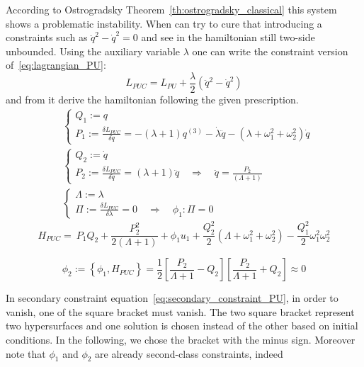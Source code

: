 According to Ostrogradsky Theorem~\ref{th:ostrogradsky_classical} this system
shows a problematic instability. When can try to cure that introducing a
constraints such as $\ddot{q}^2 - \dot{q}^2 = 0$ and see in the hamiltonian
still two-side unbounded. Using the auxiliary variable $\lambda$ one can write
the constraint version of~\eqref{eq:lagrangian_PU}:
\begin{equation} \label{eq:lagrangian_PUC}
  L_{PUC} = L_{PU} + \frac{\lambda}{2} \left(\ddot{q}^2 - \dot{q}^2\right)
\end{equation}
and from it derive the hamiltonian following the given prescription.
\begin{align*}
  & \begin{cases}
    Q_1 := q \\
    P_1 := \frac{\delta L_{PUC}}{\delta \dot{q}} =
        - (\lambda + 1) q^{(3)} - \dot{\lambda}\ddot{q}
        - (\lambda + \omega_1^2 + \omega_2^2)\dot{q}
  \end{cases} \\
  & \begin{cases}
    Q_2 := \dot{q} \\
    P_2 := \frac{\delta L_{PUC}}{\delta \ddot{q}} =
        (\lambda + 1) \ddot{q}
        \quad  \Rightarrow \quad \ddot{q} = \frac{P_2}{(\Lambda + 1)}
  \end{cases} \\
  & \begin{cases}
    \Lambda := \lambda \\
    \Pi := \frac{\delta L_{PUC}}{\delta \lambda} = 0
        \quad  \Rightarrow \quad \phi_1: \Pi = 0
  \end{cases}
\end{align*}
\begin{equation} \label{eq:ham_PUC_with_aux_vars}
   H_{PUC} =\ P_1 Q_2 + \frac{P_2^2}{2(\Lambda + 1)} + \phi_1 u_1
  + \frac{Q_2^2}{2} \left(\Lambda + \omega_1^2 + \omega_2^2 \right)
  - \frac{Q_1^2}{2} \omega_1^2 \omega_2^2
\end{equation}

\begin{equation} \label{eq:secondary_constraint_PU}
  \phi_2 :=
  \left\{ \phi_1, H_{PUC} \right\} =
  \frac{1}{2} \left[ \frac{P_2}{\Lambda + 1} - Q_2 \right]
  \left[ \frac{P_2}{\Lambda + 1} + Q_2 \right]
  \approx 0
\end{equation}

In secondary constraint equation~\eqref{eq:secondary_constraint_PU}, in order
to vanish, one of the square bracket must vanish. The two square bracket
represent two hypersurfaces and one solution is chosen instead of the other
based on initial conditions. In the following, we chose the bracket with the
minus sign. Moreover note that $\phi_1$ and $\phi_2$ are already second-class
constraints, indeed

